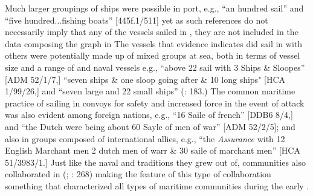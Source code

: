 Much larger groupings of ships were possible in port, e.g., “an hundred sail” and “five hundred...fishing boats” [445f.1/511] yet as such references do not necessarily imply that any of the vessels sailed in , they are not included in the data composing the graph in  The vessels that evidence indicates did sail in  with others were potentially made up of mixed groups at sea, both in terms of vessel size and a range of  and naval vessels e.g., “above 22 sail with 3  Ships \& Sloopes” [ADM 52/1/7,] “seven ships \& one sloop going after \& 10 long ships" [HCA 1/99/26,] and “seven large and 22 small ships” (\citealt{Bicheno2012}: 183.) The common maritime practice of sailing in convoys for safety and increased force in the event of attack was also evident among foreign nations, e.g., “16 Saile of french” [DDB6 8/4,] and “the Dutch were being about 60 Sayle of men of war” [ADM 52/2/5]; and also in groups composed of international allies, e.g., “the \textit{Assurance} with 12 English Marchant men 2 dutch men of warr \& 30 saile of marchant men” [HCA 51/3983/1.] Just like the naval and  traditions they grew out of,  communities also collaborated in  (\citealt{Esquemelin1678}; \citealt{Rediker1987}: 268) making the feature of this type of collaboration something that characterized all types of  maritime communities during the early . 

